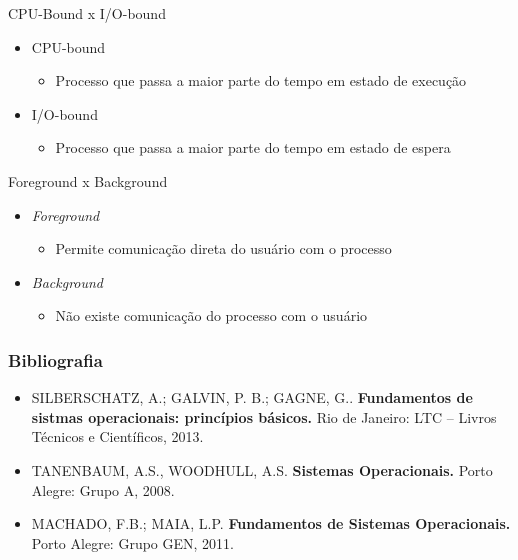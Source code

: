 \documentclass[aspectratio=169,
				xcolor=table]{beamer}
\begin{document}
	\begin{frame}{CPU-Bound x I/O-bound}
	\begin{itemize}
		\item CPU-bound
		\begin{itemize}
			\item Processo que passa a maior parte do tempo em estado de execução	
		\end{itemize}
		\item I/O-bound
		\begin{itemize}
			\item Processo que passa a maior parte do tempo em estado de espera	
		\end{itemize}
		
	\end{itemize}
	\end{frame}
	
	\begin{frame}{Foreground x Background}
		\begin{itemize}
			\item \textit{Foreground}
			\begin{itemize}
				\item Permite comunicação direta do usuário com o processo
			\end{itemize}
			\item \textit{Background}
			\begin{itemize}
				\item Não existe comunicação do processo com o usuário 
			\end{itemize}
		\end{itemize}
	\end{frame}
	
	\begin{frame}
		\frametitle{Bibliografia}
		\begin{itemize}
			\item SILBERSCHATZ, A.; GALVIN, P. B.; GAGNE, G.. \textbf{Fundamentos de sistmas operacionais: princípios básicos.} Rio de Janeiro: LTC – Livros Técnicos e Científicos, 2013.
			
			\vspace{1em}

			\item TANENBAUM, A.S., WOODHULL, A.S. \textbf{Sistemas Operacionais.} Porto Alegre: Grupo A, 2008.
			
			\vspace{1em}
			
			\item MACHADO, F.B.; MAIA, L.P. \textbf{Fundamentos de Sistemas Operacionais.} Porto Alegre: Grupo GEN, 2011.
		\end{itemize}
	\end{frame}


	\begin{frame}{}
	\end{frame}	
	
\end{document}
